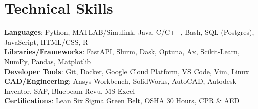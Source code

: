 \documentclass[letterpaper,11pt]{article}
\begin{document}
\section{Technical Skills}
 \begin{itemize}[leftmargin=0.15in, label={}]
    \small{\item{
     \textbf{Languages}{: Python, MATLAB/Simulink, Java, C/C++, Bash, SQL (Postgres), JavaScript, HTML/CSS, R} \\
     \textbf{Libraries/Frameworks}{: FastAPI, Slurm, Dask, Optuna, Ax, Scikit-Learn, NumPy, Pandas, Matplotlib} \\
     \textbf{Developer Tools}{: Git, Docker, Google Cloud Platform, VS Code, Vim, Linux} \\
     \textbf{CAD/Engineering}{: Ansys Workbench, SolidWorks, AutoCAD, Autodesk Inventor, SAP, Bluebeam Revu, MS Excel} \\ %
     \textbf{Certifications}{: Lean Six Sigma Green Belt, OSHA 30 Hours, CPR \& AED} \\
    }}
 \end{itemize}


\end{document}
